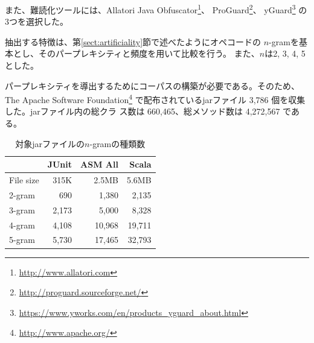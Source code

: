 \documentclass[12pt,twoside]{jbook}
\begin{document}
また、難読化ツールには、Allatori Java
Obfuscator\footnote{\url{http://www.allatori.com}}、
ProGuard\footnote{\url{http://proguard.sourceforge.net/}}、
yGuard\footnote{\url{https://www.yworks.com/en/products_yguard_about.html}}
の3つを選択した。

抽出する特徴は、第\ref{sect:artificiality}節で述べたようにオペコードの
$n$-gramを基本とし、そのパープレキシティと頻度を用いて比較を行う。
また、$n$は2, 3, 4, 5とした。

パープレキシティを導出するためにコーパスの構築が必要である。そのため、
The Apache Software Foundation\footnote{\url{http://www.apache.org/}}
で配布されているjarファイル 3,786 個を収集した。jarファイル内の総クラ
ス数は 660,465、総メソッド数は 4,272,567 である。

\begin{table}[t]
  \centering
  \caption{対象jarファイルの$n$-gramの種類数}\label{table:original}
  {\footnotesize
  \begin{tabular}{l|rrr}
    & JUnit & ASM All & Scala \\ \hline
File size & 315K & 2.5MB & 5.6MB\\ \hline
2-gram &   690 &  1,380 &  2,135 \\ 
3-gram & 2,173 &  5,000 &  8,328 \\
4-gram & 4,108 & 10,968 & 19,711 \\
5-gram & 5,730 & 17,465 & 32,793 
  \end{tabular}}
\end{table}
\end{document}
